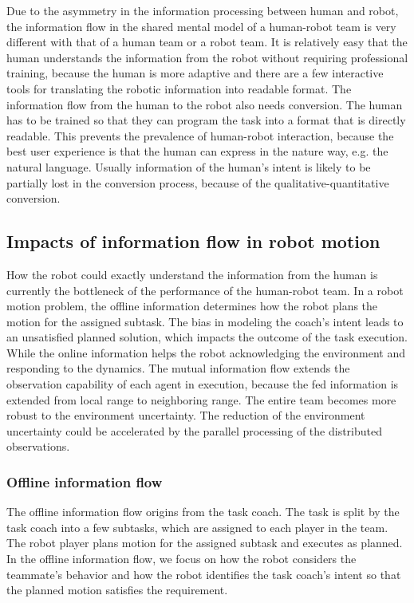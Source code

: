 \documentclass[phd]{byuprop}
\begin{document}
Due to the asymmetry in the information processing between human and robot, the information flow in the shared mental model of a human-robot team is very different with that of a human team or a robot team.
It is relatively easy that the human understands the information from the robot without requiring professional training, because the human is more adaptive and there are a few interactive tools for translating the robotic information into readable format.
The information flow from the human to the robot also needs conversion.
The human has to be trained so that they can program the task into a format that is directly readable.
This prevents the prevalence of human-robot interaction, because the best user experience is that the human can express in the nature way, e.g. the natural language.
Usually information of the human's intent is likely to be partially lost in the conversion process, because of the qualitative-quantitative conversion.

\subsection{Impacts of information flow in robot motion}

How the robot could exactly understand the information from the human is currently the bottleneck of the performance of the human-robot team.
In a robot motion problem, the offline information determines how the robot plans the motion for the assigned subtask.
The bias in modeling the coach's intent leads to an unsatisfied planned solution, which impacts the outcome of the task execution.
While the online information helps the robot acknowledging the environment and responding to the dynamics.
The mutual information flow extends the observation capability of each agent in execution, because the fed information is extended from local range to neighboring range.
The entire team becomes more robust to the environment uncertainty.
The reduction of the environment uncertainty could be accelerated by the parallel processing of the distributed observations.

\subsubsection{Offline information flow}

The offline information flow origins from the task coach.
The task is split by the task coach into a few subtasks, which are assigned to each player in the team. 
The robot player plans motion for the assigned subtask and executes as planned.
In the offline information flow, we focus on how the robot considers the teammate's behavior and how the robot identifies the task coach's intent so that the planned motion satisfies the requirement.
\end{document}
